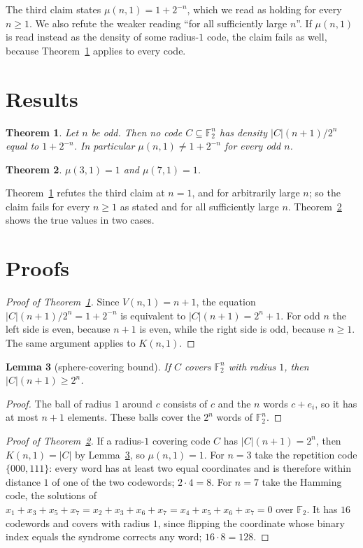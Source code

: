 \documentclass[11pt]{article}
\theoremstyle{plain}
\newtheorem{theorem}{Theorem}
\newtheorem{lemma}[theorem]{Lemma}
\theoremstyle{definition}
\theoremstyle{remark}
\newcommand{\F}{\mathbb F}
\begin{document}
The third claim states $\mu(n,1)=1+2^{-n}$, which we read as holding for every
$n\ge1$. We also refute the weaker reading ``for all sufficiently large $n$''. If
$\mu(n,1)$ is read instead as the density of some radius-$1$ code, the claim fails as
well, because Theorem~\ref{thm:parity} applies to every code.

\section{Results}

\begin{theorem}\label{thm:parity}
Let $n$ be odd. Then no code $C\subseteq\F_2^n$ has density $|C|(n+1)/2^n$ equal to
$1+2^{-n}$. In particular $\mu(n,1)\ne1+2^{-n}$ for every odd $n$.
\end{theorem}

\begin{theorem}\label{thm:values}
$\mu(3,1)=1$ and $\mu(7,1)=1$.
\end{theorem}

Theorem~\ref{thm:parity} refutes the third claim at $n=1$, and for arbitrarily large
$n$; so the claim fails for every $n\ge1$ as stated and for all sufficiently large
$n$. Theorem~\ref{thm:values} shows the true values in two cases.

\section{Proofs}

\begin{proof}[Proof of Theorem~\ref{thm:parity}]
Since $V(n,1)=n+1$, the equation $|C|(n+1)/2^n=1+2^{-n}$ is equivalent to
$|C|(n+1)=2^n+1$. For odd $n$ the left side is even, because $n+1$ is even, while the
right side is odd, because $n\ge1$. The same argument applies to $K(n,1)$.
\end{proof}

\begin{lemma}[sphere-covering bound]\label{lem:sphere}
If $C$ covers $\F_2^n$ with radius $1$, then $|C|(n+1)\ge2^n$.
\end{lemma}

\begin{proof}
The ball of radius $1$ around $c$ consists of $c$ and the $n$ words $c+e_i$, so it
has at most $n+1$ elements. These balls cover the $2^n$ words of $\F_2^n$.
\end{proof}

\begin{proof}[Proof of Theorem~\ref{thm:values}]
If a radius-$1$ covering code $C$ has $|C|(n+1)=2^n$, then $K(n,1)=|C|$ by
Lemma~\ref{lem:sphere}, so $\mu(n,1)=1$. For $n=3$ take the repetition code
$\{000,111\}$: every word has at least two equal coordinates and is therefore within
distance $1$ of one of the two codewords; $2\cdot4=8$. For $n=7$ take the Hamming
code, the solutions of $x_1+x_3+x_5+x_7=x_2+x_3+x_6+x_7=x_4+x_5+x_6+x_7=0$ over
$\F_2$. It has $16$ codewords and covers with radius $1$, since flipping the coordinate
whose binary index equals the syndrome corrects any word; $16\cdot8=128$.
\end{proof}
\end{document}
